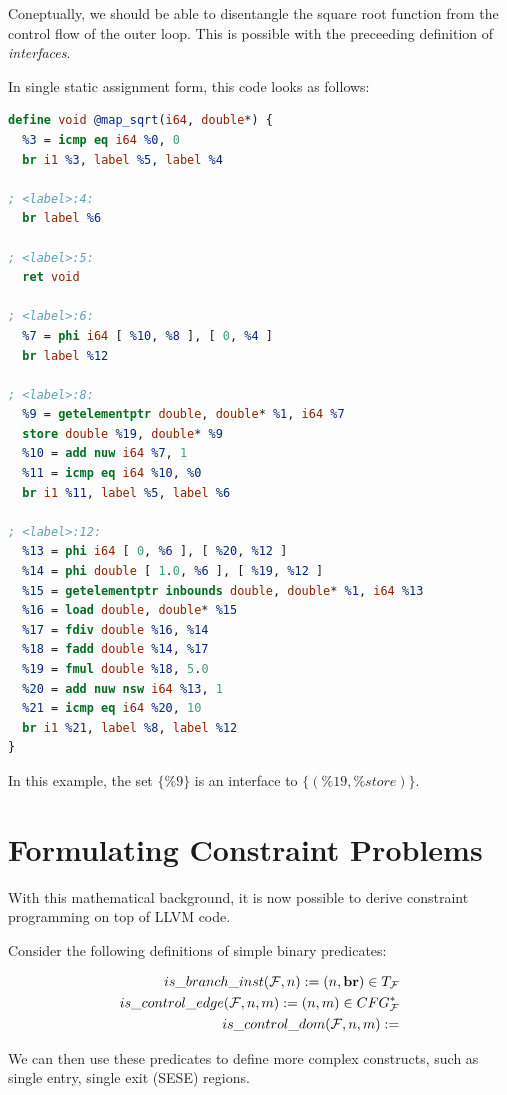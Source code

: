     Coneptually, we should be able to disentangle the square root function from
    the control flow of the outer loop.
    This is possible with the preceeding definition of {\em interfaces}.

\newpage
In single static assignment form, this code looks as follows:

\begin{lstlisting}[language=LLVM]
define void @map_sqrt(i64, double*) {
  %3 = icmp eq i64 %0, 0
  br i1 %3, label %5, label %4

; <label>:4:
  br label %6

; <label>:5:
  ret void

; <label>:6:
  %7 = phi i64 [ %10, %8 ], [ 0, %4 ]
  br label %12

; <label>:8:
  %9 = getelementptr double, double* %1, i64 %7
  store double %19, double* %9
  %10 = add nuw i64 %7, 1
  %11 = icmp eq i64 %10, %0
  br i1 %11, label %5, label %6

; <label>:12:
  %13 = phi i64 [ 0, %6 ], [ %20, %12 ]
  %14 = phi double [ 1.0, %6 ], [ %19, %12 ]
  %15 = getelementptr inbounds double, double* %1, i64 %13
  %16 = load double, double* %15
  %17 = fdiv double %16, %14
  %18 = fadd double %14, %17
  %19 = fmul double %18, 5.0
  %20 = add nuw nsw i64 %13, 1
  %21 = icmp eq i64 %20, 10
  br i1 %21, label %8, label %12
}
\end{lstlisting}

    In this example, the set $\{\%9\}$ is an interface to $\{(\%19,\%store)\}$.

\section{Formulating Constraint Problems}

    With this mathematical background, it is now possible to derive constraint
    programming on top of LLVM code.

    Consider the following definitions of simple binary predicates:

    \begin{align*}
     is\_branch\_inst(\mathcal F, n):= (n,\text{\bf br})\in T_\mathcal{F}\\
     is\_control\_edge(\mathcal F, n, m):= (n,m)\in CFG_\mathcal{F}^*\\
     is\_control\_dom(\mathcal F, n, m):= \\
    \end{align*}

    We can then use these predicates to define more complex constructs, such as
    single entry, single exit (SESE) regions.

